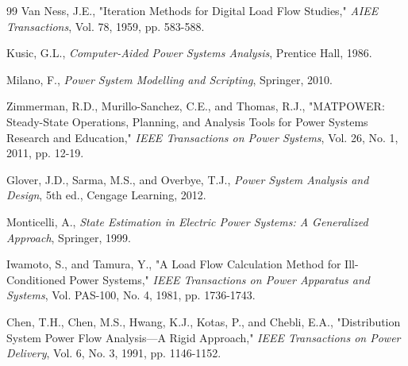 \documentclass[11pt,a4paper]{article}
\begin{document}
\begin{thebibliography}{99}
 Van Ness, J.E., "Iteration Methods for Digital Load Flow Studies," \textit{AIEE Transactions}, Vol. 78, 1959, pp. 583-588.

 Kusic, G.L., \textit{Computer-Aided Power Systems Analysis}, Prentice Hall, 1986.

 Milano, F., \textit{Power System Modelling and Scripting}, Springer, 2010.

 Zimmerman, R.D., Murillo-Sanchez, C.E., and Thomas, R.J., "MATPOWER: Steady-State Operations, Planning, and Analysis Tools for Power Systems Research and Education," \textit{IEEE Transactions on Power Systems}, Vol. 26, No. 1, 2011, pp. 12-19.

 Glover, J.D., Sarma, M.S., and Overbye, T.J., \textit{Power System Analysis and Design}, 5th ed., Cengage Learning, 2012.

 Monticelli, A., \textit{State Estimation in Electric Power Systems: A Generalized Approach}, Springer, 1999.

 Iwamoto, S., and Tamura, Y., "A Load Flow Calculation Method for Ill-Conditioned Power Systems," \textit{IEEE Transactions on Power Apparatus and Systems}, Vol. PAS-100, No. 4, 1981, pp. 1736-1743.

 Chen, T.H., Chen, M.S., Hwang, K.J., Kotas, P., and Chebli, E.A., "Distribution System Power Flow Analysis—A Rigid Approach," \textit{IEEE Transactions on Power Delivery}, Vol. 6, No. 3, 1991, pp. 1146-1152.

\end{thebibliography}
\end{document}
